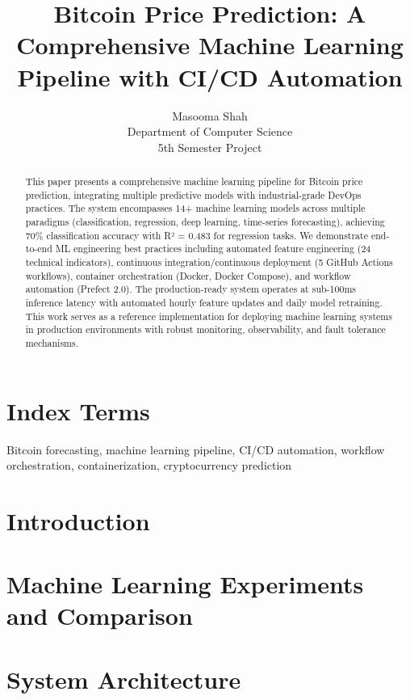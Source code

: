 \documentclass[10pt,conference,a4paper]{IEEEtran}
\title{Bitcoin Price Prediction: A Comprehensive Machine Learning Pipeline with CI/CD Automation}
\author{
    Masooma Shah\\
    Department of Computer Science\\
    5th Semester Project
}
\begin{document}
\maketitle

\begin{abstract}
This paper presents a comprehensive machine learning pipeline for Bitcoin price prediction, integrating multiple predictive models with industrial-grade DevOps practices. The system encompasses 14+ machine learning models across multiple paradigms (classification, regression, deep learning, time-series forecasting), achieving 70\% classification accuracy with R² = 0.483 for regression tasks. We demonstrate end-to-end ML engineering best practices including automated feature engineering (24 technical indicators), continuous integration/continuous deployment (5 GitHub Actions workflows), container orchestration (Docker, Docker Compose), and workflow automation (Prefect 2.0). The production-ready system operates at sub-100ms inference latency with automated hourly feature updates and daily model retraining. This work serves as a reference implementation for deploying machine learning systems in production environments with robust monitoring, observability, and fault tolerance mechanisms.
\end{abstract}

\section*{Index Terms}
Bitcoin forecasting, machine learning pipeline, CI/CD automation, workflow orchestration, containerization, cryptocurrency prediction


\section{Introduction}


\section{Machine Learning Experiments and Comparison}


\section{System Architecture}

\end{document}
